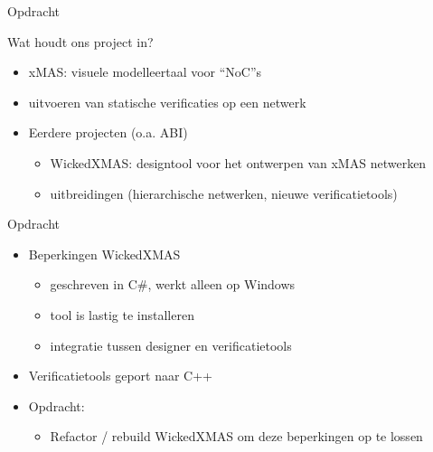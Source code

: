 \documentclass[10pt]{beamer}
\begin{document}
\begin{frame}[label=opdracht]{Opdracht}
 
\par{Wat houdt ons project in?}

\begin{itemize}

    \item xMAS: visuele modelleertaal voor ``NoC''s
    \item uitvoeren van statische verificaties op een netwerk
    \item Eerdere projecten (o.a. ABI)
    \begin{itemize}
     \item WickedXMAS: designtool voor het ontwerpen van xMAS netwerken
     \item uitbreidingen (hierarchische netwerken, nieuwe verificatietools)
    \end{itemize}

\end{itemize}

 
\end{frame}

\begin{frame}{Opdracht}

\begin{itemize}
 \item Beperkingen WickedXMAS
 \begin{itemize}
  \item geschreven in C\#, werkt alleen op Windows
  \item tool is lastig te installeren
  \item integratie tussen designer en verificatietools
 \end{itemize}
 
 \item Verificatietools geport naar C++
 
 \item Opdracht:
 \begin{itemize}
  \item Refactor / rebuild WickedXMAS om deze beperkingen op te lossen
 \end{itemize}


\end{itemize}

\end{frame}
\end{document}
